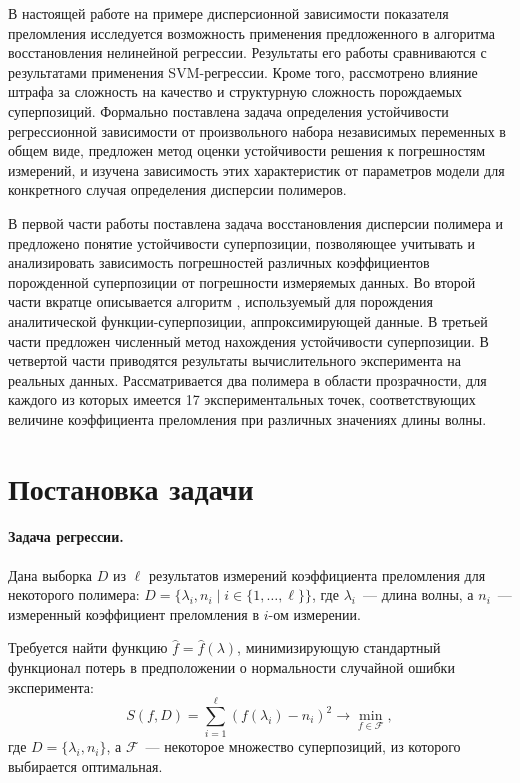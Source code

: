 \documentclass[11pt,a4paper]{article}
\theoremstyle{definition}
\begin{document}
В настоящей работе на примере дисперсионной зависимости показателя преломления
исследуется возможность применения предложенного в \cite{Rudoy13} алгоритма
восстановления нелинейной регрессии. Результаты его работы сравниваются с
результатами применения SVM-регрессии. Кроме того, рассмотрено влияние штрафа
за сложность на качество и структурную сложность порождаемых суперпозиций.
Формально поставлена задача определения устойчивости регрессионной зависимости
от произвольного набора независимых переменных в общем виде, предложен метод
оценки устойчивости решения к погрешностям измерений, и изучена зависимость
этих характеристик от параметров модели для конкретного случая определения
дисперсии полимеров.

В первой части работы поставлена задача восстановления дисперсии полимера и
предложено понятие устойчивости суперпозиции, позволяющее учитывать и анализировать
зависимость погрешностей различных коэффициентов порожденной суперпозиции от
погрешности измеряемых данных.
Во второй части вкратце описывается алгоритм \cite{Rudoy13},
используемый для порождения аналитической функции-суперпозиции, аппроксимирующей
данные. В третьей части предложен численный метод нахождения устойчивости
суперпозиции. В четвертой части приводятся результаты вычислительного
эксперимента на реальных данных. Рассматривается два полимера в области прозрачности,
для каждого из которых имеется 17 экспериментальных точек,
соответствующих величине коэффициента преломления при различных значениях длины волны.

\section{Постановка задачи}

\paragraph{Задача регрессии.}
Дана выборка $D$ из $\ell$ результатов измерений коэффициента
преломления для некоторого полимера:
$D = \{ \lambda_i, n_i \mid i \in \{ 1, \dots, \ell \} \}$, где $\lambda_i$~--- длина волны,
а $n_i$~--- измеренный коэффициент преломления в $i$-ом измерении.

Требуется найти функцию $\hat{f} = \hat{f}(\lambda)$, минимизирующую стандартный
функционал потерь в предположении о нормальности случайной ошибки эксперимента:
\begin{equation}
  S(f, D) = \sum_{i = 1}^\ell (f(\lambda_i) - n_i)^2 \rightarrow \min_{f \in \mathcal{F}},
  \label{eq:s}
\end{equation}
где $D = \{ \lambda_i, n_i\}$, а $\mathcal{F}$~---
некоторое множество суперпозиций, из которого выбирается оптимальная.
\end{document}
